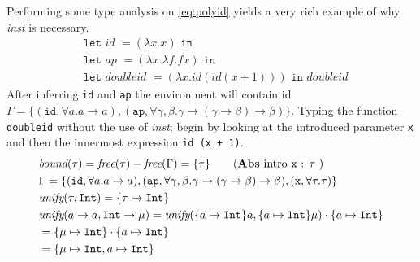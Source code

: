 \documentclass[11pt,oneside,a4paper]{report}
\begin{document}
\begin{exmp}
    Performing some type analysis on \autoref{eq:polyid} yields a very rich example of why \textit{inst} is necessary.
    \begin{align}
      &\texttt{let } \textit{id } = (\lambda x.x) \texttt{ in } \label{eq:polyid}\\
      &\texttt{let } \textit{ap } = (\lambda x . \lambda f . f x) \texttt{ in } \tag*{}\\
      &\texttt{let } \textit{doubleid } = (\lambda x.id (id (x + 1))) \texttt{ in } \textit{doubleid} \tag*{}
    \end{align}
    After inferring \texttt{id} and \texttt{ap} the environment will contain id $\Gamma = \{ (\texttt{id}, \forall a . a \rightarrow a), (\texttt{ap}, \forall \gamma,\beta . \gamma \rightarrow (\gamma \rightarrow \beta) \rightarrow \beta)\}$.
    Typing the function \texttt{doubleid} without the use of \textit{inst}; begin by looking at the introduced parameter \texttt{x} and then the innermost expression \texttt{id (x + 1)}. 
\begin{align}
    &\textit{bound}(\tau) = \textit{free}(\tau) - \textit{free}(\Gamma) = \{ \tau \} \tag{\textbf{Abs} intro \texttt{x} : $\tau$ }\\
    &\Gamma = \{ (\texttt{id}, \forall a . a \rightarrow a), (\texttt{ap}, \forall \gamma,\beta . \gamma \rightarrow (\gamma \rightarrow \beta) \rightarrow \beta), (\texttt{x}, \forall \tau . \tau) \}\\
    &\textit{unify}(\tau, \texttt{Int}) = \{ \tau \mapsto \texttt{Int} \}\\
    &\textit{unify}(a \rightarrow a, \texttt{Int} \rightarrow \mu) = \textit{unify}(\{ a \mapsto \texttt{Int} \}a, \{ a \mapsto \texttt{Int} \}\mu) \cdot \{ a \mapsto \texttt{Int} \}\\
    &= \{ \mu \mapsto \texttt{Int} \} \cdot \{ a \mapsto \texttt{Int} \} \tag*{}\\
    &= \{ \mu \mapsto \texttt{Int}, a \mapsto \texttt{Int} \} \tag*{}
    \label{eq:unifyres}
\end{align}

\end{exmp}
\end{document}
